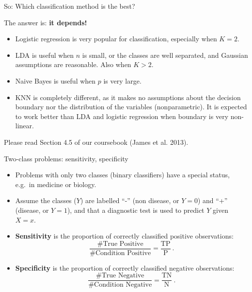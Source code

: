 \documentclass[10pt,ignorenonframetext,]{beamer}
\begin{document}
\begin{frame}

\begin{block}{So: Which classification method is the best?}

\vspace{2mm}

The answer is: \textbf{it depends!}

\begin{itemize}
\item
  Logistic regression is very popular for classification, especially
  when \(K = 2\).
\item
  LDA is useful when \(n\) is small, or the classes are well separated,
  and Gaussian assumptions are reasonable. Also when \(K > 2\).
\item
  Naive Bayes is useful when \(p\) is very large.
\item
  KNN is completely different, as it makes no assumptions about the
  decision boundary nor the distribution of the variables
  (nonparametric). It is expected to work better than LDA and logistic
  regression when boundary is very non-linear.
\end{itemize}

\vspace{2mm} Please read Section 4.5 of our coursebook (James et al.
2013).

\end{block}

\end{frame}

\begin{frame}{Two-class problems: sensitivity, specificity}

\begin{itemize}
\item
  Problems with only two classes (binary classifiers) have a special
  status, e.g.~in medicine or biology.
\item
  Assume the classes (\(Y\)) are labelled ``-'' (non disease, or
  \(Y=0\)) and ``+'' (disease, or \(Y=1\)), and that a diagnostic test
  is used to predict \(Y\) given \(X=x\).
\item
  \textbf{Sensitivity} is the proportion of correctly classified
  positive observations:
  \[\frac{\# \text{True Positive}}{\# \text{Condition Positive}}=\frac{\text{TP}}{\text{P}} \ .\]
\item
  \textbf{Specificity} is the proportion of correctly classified
  negative observations:
  \[\frac{\# \text{True Negative}}{\# \text{Condition Negative}}=\frac{\text{TN}}{\text{N}} \ .\]
\end{itemize}

\end{frame}
\end{document}

